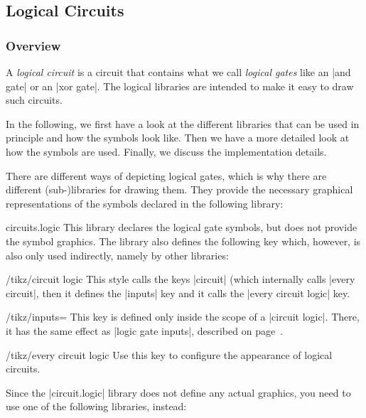 \subsection{Logical Circuits}

\subsubsection{Overview}

A \emph{logical circuit} is a circuit that contains what we call \emph{logical
gates} like an |and gate| or an |xor gate|. The logical libraries are intended
to make it easy to draw such circuits.

In the following, we first have a look at the different libraries that can be
used in principle and how the symbols look like. Then we have a more detailed
look at how the symbols are used. Finally, we discuss the implementation
details.

There are different ways of depicting logical gates, which is why there are
different (sub-)libraries for drawing them. They provide the necessary
graphical representations of the symbols declared in the following library:

\begin{tikzlibrary}{circuits.logic}
    This library declares the logical gate symbols, but does not provide the
    symbol graphics. The library also defines the following key which, however,
    is also only used indirectly, namely by other libraries:
    \begin{key}{/tikz/circuit logic}
        This style calls the keys |circuit| (which internally calls
        |every circuit|, then it defines the |inputs| key and it calls the
        |every circuit logic| key.
        \begin{key}{/tikz/inputs=}
            This key is defined only inside the scope of a |circuit logic|.
            There, it has the same effect as |logic gate inputs|, described on
            page~\pageref{logic-gate-inputs}.
        \end{key}
        \begin{stylekey}{/tikz/every circuit logic}
            Use this key to configure the appearance of logical circuits.
        \end{stylekey}
    \end{key}
\end{tikzlibrary}

Since the |circuit.logic| library does not define any actual graphics, you need
to use one of the following libraries, instead:

